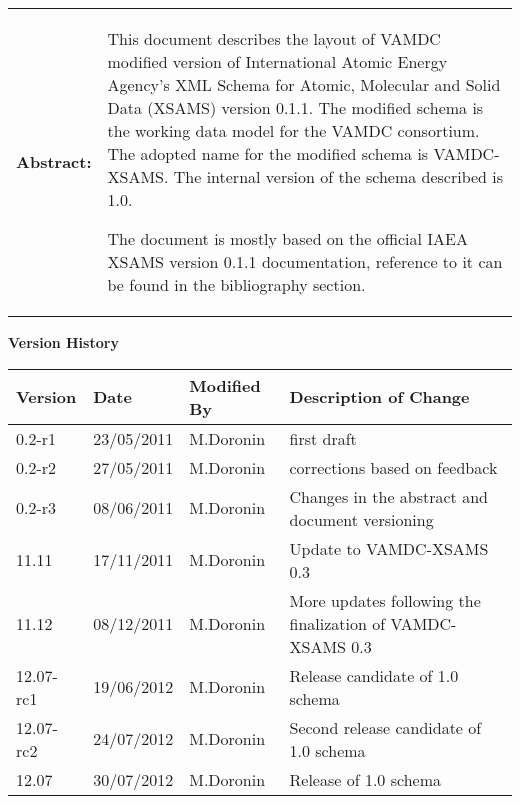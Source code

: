 {\begin{titlepage}
\noindent \begin{tabular}{p{1.7in}p{4.3in}}

\textbf{Abstract:} & 
This document describes the layout of VAMDC modified version of
International Atomic Energy Agency's XML Schema for Atomic, Molecular and Solid Data (XSAMS) version 0.1.1.
The modified schema is the working data model for the VAMDC consortium.
The adopted name for the modified schema is VAMDC-XSAMS.
The internal version of the schema described is 1.0.

The document is mostly based on the official IAEA XSAMS version 0.1.1 documentation, reference to it can be found
in the bibliography section.
\end{tabular}



\end{titlepage}

\noindent \large \textbf{Version History} \normalsize

\noindent \begin{tabular}{|l|l|l|l|} 
\hline 
\textbf{Version} & \textbf{Date} & \textbf{Modified By} & \textbf{Description of Change} \\ \hline 
0.2-r1	& 23/05/2011 & M.Doronin & first draft \\ \hline 
0.2-r2	& 27/05/2011 & M.Doronin & corrections based on feedback \\ \hline 
0.2-r3	& 08/06/2011 & M.Doronin & Changes in the abstract and document versioning \\ \hline 
11.11 	& 17/11/2011 & M.Doronin & Update to VAMDC-XSAMS 0.3 \\ \hline 
11.12 	& 08/12/2011 & M.Doronin & More updates following the finalization of VAMDC-XSAMS 0.3 \\ \hline 
12.07-rc1 & 19/06/2012 & M.Doronin & Release candidate of 1.0 schema \\ \hline 
12.07-rc2 & 24/07/2012 & M.Doronin & Second release candidate of 1.0 schema \\ \hline
12.07 	& 30/07/2012 & M.Doronin & Release of 1.0 schema \\ \hline 
\end{tabular}



}